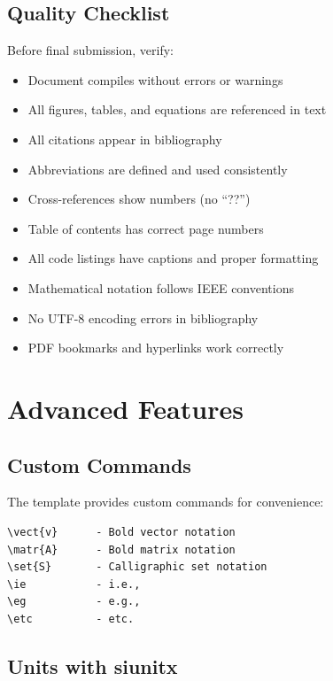 \subsection*{Quality Checklist}

Before final submission, verify:

\begin{itemize}
    \item[$\square$] Document compiles without errors or warnings
    \item[$\square$] All figures, tables, and equations are referenced in text
    \item[$\square$] All citations appear in bibliography
    \item[$\square$] Abbreviations are defined and used consistently
    \item[$\square$] Cross-references show numbers (no ``??'')
    \item[$\square$] Table of contents has correct page numbers
    \item[$\square$] All code listings have captions and proper formatting
    \item[$\square$] Mathematical notation follows IEEE conventions
    \item[$\square$] No UTF-8 encoding errors in bibliography
    \item[$\square$] PDF bookmarks and hyperlinks work correctly
\end{itemize}

\section*{Advanced Features}

\subsection*{Custom Commands}

The template provides custom commands for convenience:

\begin{verbatim}
\vect{v}      - Bold vector notation
\matr{A}      - Bold matrix notation
\set{S}       - Calligraphic set notation
\ie           - i.e.,
\eg           - e.g.,
\etc          - etc.
\end{verbatim}

\subsection*{Units with siunitx}

